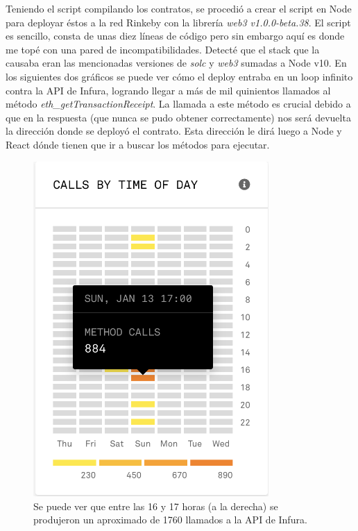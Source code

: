 Teniendo el script compilando los contratos, se procedió a crear el script en Node para deployar
éstos a la red Rinkeby con la librería \textit{web3 v1.0.0-beta.38}. El script es sencillo, consta
de unas diez líneas de código pero sin embargo aquí es donde me topé con una pared de 
incompatibilidades. Detecté que el stack que la causaba eran las mencionadas versiones de 
\textit{solc} y \textit{web3} sumadas a Node v10. En los siguientes dos gráficos se puede ver
cómo el deploy entraba en un loop infinito contra la API de Infura, logrando llegar a más de mil
quinientos llamados al método \textit{eth\_getTransactionReceipt}. La llamada a este método es 
crucial debido a que en la respuesta (que nunca se pudo obtener correctamente) nos será devuelta
la dirección donde se deployó el contrato. Esta dirección le dirá luego a Node y React dónde tienen
que ir a buscar los métodos para ejecutar.

\begin{figure}[htbp!] 
\centering    
\includegraphics[width=0.8\textwidth]{infura-calls-1}
\caption[infuracalls1]{Se puede ver que entre las 16 y 17 horas (a la derecha) se produjeron un aproximado de 1760 llamados a la API de Infura.}
\label{fig:infura-calls-1}
\end{figure}

